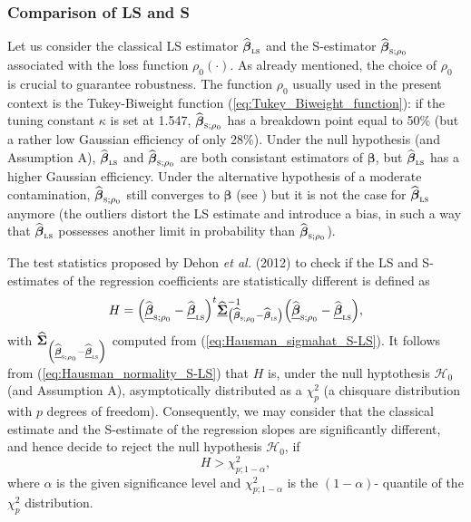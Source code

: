 \subsubsection{Comparison of LS and S}

Let us consider the classical LS estimator $\sthat{\boldsymbol\beta%
}_{\stsc{LS}}$ and the S-estimator $\sthat{\boldsymbol\beta}%
_{\stsc{S};\rho_{0}}$ associated with the loss function $\rho_{0}\left(
\cdot\right)  $. As already mentioned, the choice of $\rho_{0}$ is crucial to
guarantee robustness. The function $\rho_{0}$ usually used in the present
context is the Tukey-Biweight function (\ref{eq:Tukey_Biweight_function}): if
the tuning constant $\kappa$ is set at 1.547, $\sthat{\boldsymbol\beta%
}_{\stsc{S};\rho_{0}}$ has a breakdown point equal to 50\% (but a rather low
Gaussian efficiency of only 28\%). Under the null hypothesis (and Assumption
A), $\sthat{\boldsymbol\beta}_{\stsc{LS}}$ and $\widehat
{\boldsymbol\beta}_{\stsc{S};\rho_{0}}$ are both consistant estimators of
$\boldsymbol\beta$, but $\sthat{\boldsymbol\beta}_{\stsc{LS}}$ has a
higher Gaussian efficiency. Under the alternative hypothesis of a moderate
contamination, $\sthat{\boldsymbol\beta}_{\stsc{S};\rho_{0}}$ still
converges to $\boldsymbol\beta$ (see \citealp{Omelka:2010})
but it is not the case for $\sthat{\boldsymbol\beta}_{\stsc{LS}}$
anymore (the outliers distort the LS estimate and introduce a bias, in such a
way that $\sthat{\boldsymbol\beta}_{\stsc{LS}}$ possesses another limit
in probability than $\sthat{\boldsymbol\beta}_{\stsc{S};\rho_{0}}$).

The test statistics proposed by Dehon \textit{et al.} (2012) to check if the
LS and S-estimates of the regression coefficients are statistically different
is defined as
\begin{equation}
H=\left(  \sthat{\underline{\boldsymbol\beta}}_{\stsc{S};\rho_{0}%
}-\sthat{\underline{\boldsymbol\beta}}_{\stsc{LS}}\right)  ^{t}%
\sthat{\underline{\boldsymbol{\Sigma}}}_{\left(  \sthat{\boldsymbol{\beta
}}_{\stsc{S};\rho_{0}}-\sthat{\boldsymbol\beta}_{\stsc{LS}}\right)
}^{-1}\left(  \sthat{\underline{\boldsymbol\beta}}_{\stsc{S};\rho_{0}%
}-\sthat{\underline{\boldsymbol\beta}}_{\stsc{LS}}\right)  ,
\label{Hausman_SvsLS}%
\end{equation}
with $\sthat{\boldsymbol{\Sigma}}_{\left(  \sthat{\underline
{\boldsymbol\beta}}_{\stsc{S};\rho_{0}}-\sthat{\underline
{\boldsymbol\beta}}_{\stsc{LS}}\right)  }$ computed from
(\ref{eq:Hausman_sigmahat_S-LS}). It follows from
(\ref{eq:Hausman_normality_S-LS}) that $H$ is, under the null hyptothesis
$\mathcal{H}_{0}$ (and Assumption A), asymptotically distributed as a
$\chi_{p}^{2}$ (a chisquare distribution with $p$ degrees of freedom).
Consequently, we may consider that the classical estimate and the S-estimate
of the regression slopes are significantly different, and hence decide to
reject the null hypothesis $\mathcal{H}_{0}$, if
\[
H>\chi_{p;1-\alpha}^{2},
\]
where $\alpha$ is the given significance level and $\chi_{p;1-\alpha}^{2}$ is
the $\left(  1-\alpha\right)  $- quantile of the $\chi_{p}^{2}$ distribution.

